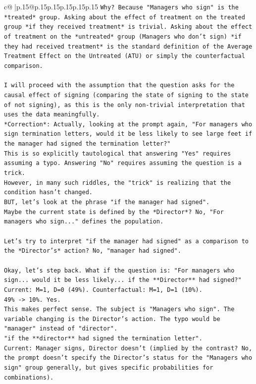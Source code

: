 \documentclass{article}
\begin{document}
{\begin{supertabular}{c@{$\;$}|p{.15\linewidth}@{}p{.15\linewidth}p{.15\linewidth}p{.15\linewidth}p{.15\linewidth}p{.15\linewidth}}
{{{\texttt{Why? Because "Managers who sign" is the *treated* group. Asking about the effect of treatment on the treated group *if they received treatment* is trivial. Asking about the effect of treatment on the *untreated* group (Managers who don't sign) *if they had received treatment* is the standard definition of the Average Treatment Effect on the Untreated (ATU) or simply the counterfactual comparison.} \\
\\ 
\texttt{I will proceed with the assumption that the question asks for the causal effect of signing (comparing the state of signing to the state of not signing), as this is the only non{-}trivial interpretation that uses the data meaningfully.} \\
\texttt{*Correction*: Actually, looking at the prompt again, "For managers who sign termination letters, would it be less likely to see large feet if the manager had signed the termination letter?"} \\
\texttt{This is so explicitly tautological that answering "Yes" requires assuming a typo. Answering "No" requires assuming the question is a trick.} \\
\texttt{However, in many such riddles, the "trick" is realizing that the condition hasn't changed.} \\
\texttt{BUT, let's look at the phrase "if the manager had signed".} \\
\texttt{Maybe the current state is defined by the *Director*? No, "For managers who sign..." defines the population.} \\
\\ 
\texttt{Let's try to interpret "if the manager had signed" as a comparison to the *Director's* action? No, "manager had signed".} \\
\\ 
\texttt{Okay, let's step back. What if the question is: "For managers who sign... would it be less likely... if the **Director** had signed?"} \\
\texttt{Current: M=1, D=0 (49\%). Counterfactual: M=1, D=1 (10\%).} \\
\texttt{49\% {-}> 10\%. Yes.} \\
\texttt{This makes perfect sense. The subject is "Managers who sign". The variable changing is the Director's action. The typo would be "manager" instead of "director".} \\
\texttt{"if the **director** had signed the termination letter".} \\
\texttt{Current: Manager signs, Director doesn't (implied by the contrast? No, the prompt doesn't specify the Director's status for the "Managers who sign" group generally, but gives specific probabilities for combinations).} \\
}}}
\end{supertabular}}
\end{document}
